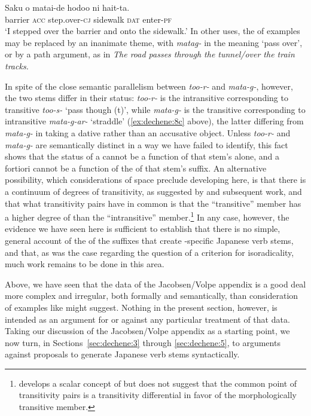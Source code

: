 \documentclass[output=paper,
modfonts
]{LSP/langsci}
\begin{document}
	\ex \label{ex:dechene:15b} 
	\gll Saku o matai-de hodoo ni hait-ta. \\
	barrier \textsc{acc} step.over-\textsc{cj} sidewalk \textsc{dat} enter-\textsc{pf}\\
	\glt `I stepped over the barrier and onto the sidewalk.'
	\z
\z
In other uses, the  of examples  may be replaced by an
inanimate theme, with \textit{matag-} in the meaning `pass over', or by
a path argument, as in \textit{The road passes through the tunnel/over the
train tracks.}

In spite of the close semantic parallelism between \textit{too-r-} and
\textit{mata-g-}, however, the two stems differ in their 
status: \textit{too-r-} is the intransitive corresponding to transitive
\textit{too-s-} `pass though (t)', while \textit{mata-g-} is the transitive
corresponding to intransitive \textit{mata-g-ar-} `straddle' (\ref{ex:dechene:8c} above),
the latter differing from \textit{mata-g-} in taking a dative rather than
an accusative object. Unless \textit{too-r-} and \textit{mata-g-} are
semantically distinct in a way we have failed to identify, this fact
shows that the  status of a  cannot be a function of
that stem's  alone, and a fortiori cannot be a function of the
 of that stem's suffix. An alternative possibility, which
considerations of space preclude developing here, is that there is a
continuum of degrees of transitivity, as suggested by \citet{hopper1980a} and subsequent work, and that what transitivity pairs
have in common is that the ``transitive'' member has a higher degree of
 than the ``intransitive'' member.\footnote{\citet[73--74]{jacobsen1992a} develops a scalar concept of  but does not suggest that the common point of transitivity pairs is a transitivity
  differential in favor of the morphologically transitive member.} In
any case, however, the evidence we have seen here is sufficient to
establish that there is no simple, general account of the  of
the suffixes that create -specific Japanese verb stems, and
that, as was the case regarding the question of a criterion for
isoradicality, much work remains to be done in this area.

Above, we have seen that the data of the Jacobsen/Volpe appendix is a
good deal more complex and irregular, both formally and semantically,
than consideration of examples like  might suggest. Nothing in the
present section, however, is intended as an argument for or against any
particular treatment of that data. Taking our discussion of the
Jacobsen/Volpe appendix as a starting point, we now turn, in Sections~\ref{sec:dechene:3}
through \ref{sec:dechene:5}, to arguments against proposals to generate Japanese verb
stems syntactically.
\end{document}
